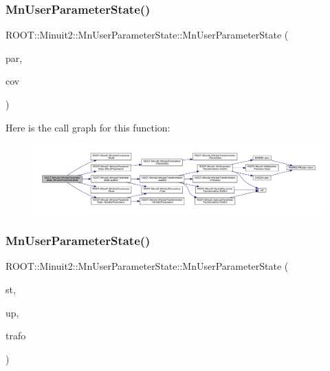 \subsubsection{\texorpdfstring{MnUserParameterState()}{MnUserParameterState()}\hspace{0.1cm}{\footnotesize\ttfamily [6/16]}}
{\footnotesize\ttfamily R\+O\+O\+T\+::\+Minuit2\+::\+Mn\+User\+Parameter\+State\+::\+Mn\+User\+Parameter\+State (\begin{DoxyParamCaption}\item[{const \mbox{\hyperlink{classROOT_1_1Minuit2_1_1MnUserParameters}{Mn\+User\+Parameters}} \&}]{par,  }\item[{const \mbox{\hyperlink{classROOT_1_1Minuit2_1_1MnUserCovariance}{Mn\+User\+Covariance}} \&}]{cov }\end{DoxyParamCaption})}

Here is the call graph for this function\+:\nopagebreak
\begin{figure}[H]
\begin{center}
\leavevmode
\includegraphics[width=350pt]{d3/de0/classROOT_1_1Minuit2_1_1MnUserParameterState_aafeef85943691c9736a58d6a7830259a_cgraph}
\end{center}
\end{figure}
\mbox{\label{classROOT_1_1Minuit2_1_1MnUserParameterState_a8214c3f41958849f1aaae4865bb5b129}} 
\subsubsection{\texorpdfstring{MnUserParameterState()}{MnUserParameterState()}\hspace{0.1cm}{\footnotesize\ttfamily [7/16]}}
{\footnotesize\ttfamily R\+O\+O\+T\+::\+Minuit2\+::\+Mn\+User\+Parameter\+State\+::\+Mn\+User\+Parameter\+State (\begin{DoxyParamCaption}\item[{const \mbox{\hyperlink{classROOT_1_1Minuit2_1_1MinimumState}{Minimum\+State}} \&}]{st,  }\item[{double}]{up,  }\item[{const \mbox{\hyperlink{classROOT_1_1Minuit2_1_1MnUserTransformation}{Mn\+User\+Transformation}} \&}]{trafo }\end{DoxyParamCaption})}



